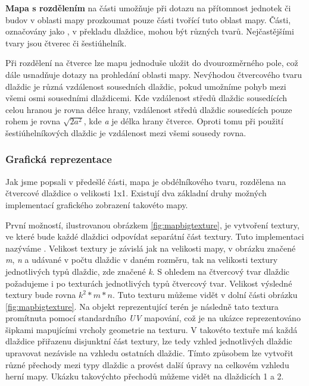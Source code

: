 \textbf{Mapa s rozdělením} na části umožňuje při dotazu na přítomnost jednotek či budov v oblasti mapy prozkoumat pouze části tvořící tuto oblast mapy. Části, označovány jako \textit{ }, v překladu dlaždice, mohou být různých tvarů. Nejčastějšími tvary jsou čtverec či šestiúhelník. 

Při rozdělení na čtverce lze mapu jednoduše uložit do dvourozměrného pole, což dále usnadňuje dotazy na prohledání oblasti mapy. Nevýhodou čtvercového tvaru dlaždic je různá vzdálenost sousedních dlaždic, pokud umožníme pohyb mezi všemi osmi sousedními dlaždicemi. Kde vzdálenost středů dlaždic sousedících celou hranou je rovna délce hrany, vzdálenost středů dlaždic sousedících pouze rohem je rovna \(\sqrt{2a^2}\), kde \textit{a} je délka hrany čtverce. Oproti tomu při použití šestiúhelníkových dlaždic je vzdálenost mezi všemi sousedy rovna. 

\subsubsection{Grafická reprezentace} 
\label{sec:mapgraphicsanalaysis}
Jak jsme popsali v předešlé části, mapa je obdélníkového tvaru, rozdělena na čtvercové dlaždice o velikosti 1x1. Existují dva základní druhy možných implementací grafického zobrazení takovéto mapy.

První možností, ilustrovanou obrázkem \ref{fig:mapbigtexture}, je vytvoření textury, ve které bude každé dlaždici odpovídat separátní část textury. Tuto implementaci nazýváme . Velikost textury je závislá jak na velikosti mapy, v obrázku značené \textit{m}, \textit{n} a udávané v počtu dlaždic v daném rozměru, tak na velikosti textury jednotlivých typů dlaždic, zde značené \textit{k}. S ohledem na čtvercový tvar dlaždic požadujeme i po texturách jednotlivých typů čtvercový tvar. Velikost výsledné textury bude rovna \(k^2 * m * n\). Tuto texturu můžeme vidět v dolní části obrázku \ref{fig:mapbigtexture}. Na objekt reprezentující terén je následně tato textura promítnuta pomocí standardního \textit{UV} mapování, což je na ukázce reprezentováno šipkami mapujícími vrcholy geometrie na texturu. V takovéto textuře má každá dlaždice přiřazenu disjunktní část textury, lze tedy vzhled jednotlivých dlaždic upravovat nezávisle na vzhledu ostatních dlaždic. Tímto způsobem lze vytvořit různé přechody mezi typy dlaždic a provést další úpravy na celkovém vzhledu herní mapy. Ukázku takovýchto přechodů můžeme vidět na dlaždicích 1 a 2.
 
